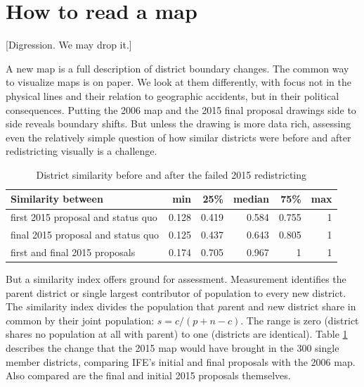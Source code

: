 \documentclass[letter,12pt]{article}
\begin{document}
\section{How to read a map}

[Digression. We may drop it.]

A new map is a full description of district boundary changes. The common way to visualize maps is on paper. We look at them differently, with focus not in the physical lines and their relation to geographic accidents, but in their political consequences. Putting the 2006 map and the 2015 final proposal drawings side to side reveals boundary shifts. But unless the drawing is more data rich, assessing even the relatively simple question of how similar districts were before and after redistricting visually is a challenge. 

\begin{table}
\begin{center}
  \begin{tabular}{lrrrrr}
  Similarity between                 &   min  &  25\%  & median &  75\% &  max \\ \hline
  first 2015 proposal and status quo & 0.128  & 0.419  & 0.584  & 0.755 &  1   \\
  final 2015 proposal and status quo & 0.125  & 0.437  & 0.643  & 0.805 &  1   \\
  first and final 2015 proposals     & 0.174  & 0.705  & 0.967  & 1     &  1   \\
  \end{tabular}
  \caption{District similarity before and after the failed 2015 redistricting}\label{T:simIndex}
\end{center}
\end{table}

But a similarity index \citep[][:15--7]{cox.katz.2002} offers ground for assessment. Measurement identifies the parent district or single largest contributor of population to every new district. The $s$imilarity index divides the population that $p$arent and $n$ew district share in $c$ommon by their joint population: $s = c / (p + n - c)$. The range is zero (district shares no population at all with parent) to one (districts are identical). Table \ref{T:simIndex} describes the change that the 2015 map would have brought in the 300 single member districts, comparing IFE's initial and final proposals with the 2006 map. Also compared are the final and initial 2015 proposals themselves. 
\end{document}
